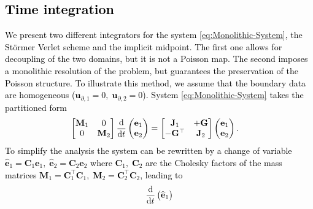 \documentclass[11pt,a4paper]{article}
\newcommand{\revone}[1]{{\textcolor{black}{#1}}}
\begin{document}
\revone{
\section{Time integration}\label{sec:time-integration}
We present two different integrators for the system \eqref{eq:Monolithic-System}, the St\"ormer Verlet scheme and the implicit midpoint. The first one allows for decoupling of the two domains, but it is not a Poisson map. The second imposes a monolithic resolution of the problem, but guarantees the preservation of the Poisson structure. To illustrate this method, we assume that the boundary data are homogeneous ($\mathbf{u}_{\partial, 1}=0, \; \mathbf{u}_{\partial, 2}=0$). System \eqref{eq:Monolithic-System} takes the partitioned form
\begin{equation}\label{eq:interconnected_system}
\begin{aligned}
        \begin{bmatrix}
            \mathbf{M}_{1} & 0 \\
            0 & \mathbf{M}_{2}
        \end{bmatrix} 
        \odv{}{t}
        \begin{pmatrix}
            \mathbf{e}_{1} \\
            \mathbf{e}_{2}
        \end{pmatrix} &=
        \begin{bmatrix}
            \mathbf{J}_1 & +\mathbf{G} \\
            -\mathbf{G}^\top & \mathbf{J}_2
        \end{bmatrix}
        \begin{pmatrix}
            \mathbf{e}_{1} \\
            \mathbf{e}_{2}
        \end{pmatrix}.
\end{aligned}
\end{equation}
To simplify the analysis the system can be rewritten by a change of variable $\widehat{\mathbf{e}}_1 = \mathbf{C}_1 \mathbf{e}_1, \; \widehat{\mathbf{e}}_2 = \mathbf{C}_2 \mathbf{e}_2$ where $\mathbf{C}_1, \; \mathbf{C}_2$ are the Cholesky factors of the mass matrices $\mathbf{M}_1 = \mathbf{C}_1^\top \mathbf{C}_1, \; \mathbf{M}_2 = \mathbf{C}_2^\top \mathbf{C}_2$, leading to 
\begin{equation}\label{eq:interconnected_system_hat}
\begin{aligned}
        \odv{}{t}
        \begin{pmatrix}
            \widehat{\mathbf{e}}_{1} \\

\end{pmatrix}
\end{aligned}
\end{equation}}
\end{document}

